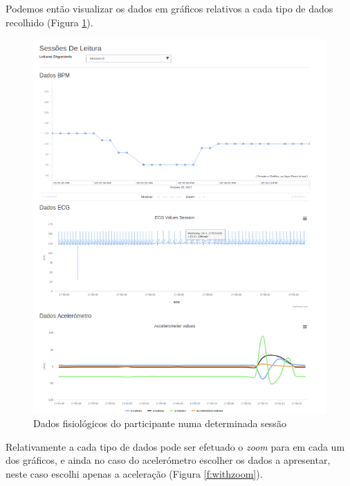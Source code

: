 Podemos então visualizar os dados em gráficos relativos a cada tipo de dados recolhido (Figura \ref{f:leiturasdados}). 

\begin{figure}[H]
\centering
\includegraphics[width=1\textwidth]{imgs/dadosfisiologicos-web.png}
\caption[Dados fisiológicos do participante numa determinada sessão]{Dados fisiológicos do participante numa determinada sessão}
\label{f:leiturasdados}
\end{figure}
 Relativamente a cada tipo de dados pode ser efetuado o \textit{zoom} para em cada um dos gráficos, e ainda no caso do acelerómetro escolher os dados a apresentar, neste caso escolhi apenas a aceleração (Figura \ref{f:withzoom}).
 
